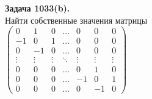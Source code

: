 \documentclass[a4paper, 12pt]{article}
\newenvironment{problem}[2][Задача]
{ \begin{mdframed}[backgroundcolor=gray!10] \textbf{#1 #2.} \\}
	{  \end{mdframed}}
\begin{document}
\begin{problem}{1033(b)}
Найти собственные значения матрицы\\
$\left( \begin{array}{rrrrrrr}0 & 1 & 0 & \ldots & 0 & 0 & 0\\ -1 & 0 & 1 & \ldots & 0 & 0 & 0 \\ 0 & -1 & 0 & \ldots & 0 & 0 & 0 \\ \vdots & \vdots & \vdots & \ddots & \vdots & \vdots & \vdots \\ 0 & 0 & 0 & \ldots & 0 & 1 & 0 \\ 0 & 0 & 0 & \ldots & -1 & 0 & 1 \\ 0 & 0 & 0 & \ldots & 0 & -1 & 0 \end{array} \right)$

\end{problem}
\end{document}
